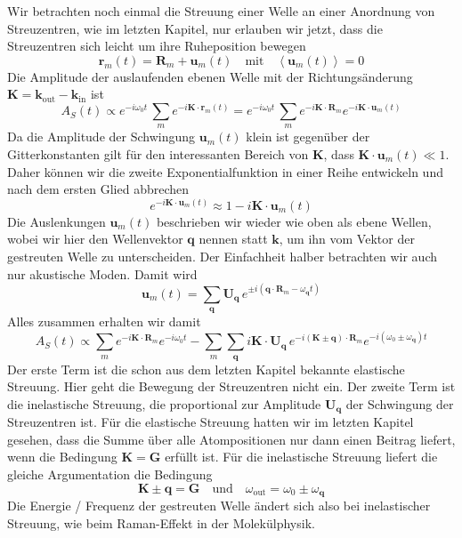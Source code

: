 Wir betrachten noch einmal die Streuung einer Welle an einer Anordnung von Streuzentren, wie im letzten Kapitel, nur erlauben wir jetzt, dass die Streuzentren sich leicht um ihre Ruheposition bewegen
\begin{equation}
\mathbf{r}_m(t) = \mathbf{R}_m + \mathbf{u}_m(t) \quad \text{mit} \quad \left<\mathbf{u}_m(t)\right> = 0
\end{equation}
Die Amplitude der auslaufenden ebenen Welle mit der Richtungsänderung $\mathbf{K} = \mathbf{k}_\text{out} - \mathbf{k}_\text{in}$ ist
\begin{equation}
A_S(t) \propto e^{-i \omega_0 t} \, \sum_m e^{-i \mathbf{K} \cdot \mathbf{r}_m(t)} =
e^{-i \omega_0 t} \, \sum_m e^{-i \mathbf{K} \cdot \mathbf{R}_m}  e^{-i \mathbf{K} \cdot \mathbf{u}_m(t)}
\end{equation}
Da die Amplitude der Schwingung $\mathbf{u}_m(t)$ klein ist gegenüber der Gitterkonstanten  gilt für den interessanten Bereich von $\mathbf{K}$, dass  $\mathbf{K} \cdot\mathbf{u}_m(t) \ll 1 $. Daher können wir die zweite Exponentialfunktion in einer Reihe entwickeln und nach dem ersten Glied abbrechen
\begin{equation}
 e^{-i \mathbf{K} \cdot \mathbf{u}_m(t)} \approx 1 - i \mathbf{K} \cdot \mathbf{u}_m(t)
\end{equation}
Die Auslenkungen $\mathbf{u}_m(t)$ beschrieben wir wieder wie oben als ebene Wellen, wobei wir hier den Wellenvektor $\mathbf{q}$ nennen statt $\mathbf{k}$, um ihn vom Vektor der gestreuten Welle zu unterscheiden. Der Einfachheit halber betrachten wir auch nur akustische Moden. Damit wird
\begin{equation}
\mathbf{u}_m(t) = \sum_\mathbf{q} \mathbf{U}_\mathbf{q} \, 
e^{ \pm i ( \mathbf{q} \cdot \mathbf{R}_m - \omega_\mathbf{q} t ) }
\end{equation}
Alles zusammen erhalten wir damit
\begin{equation}
A_S(t) \propto 
\sum_m e^{-i \mathbf{K} \cdot \mathbf{R}_m}  
e^{-i \omega_0 t} 
-
\sum_m \sum_\mathbf{q}  i \mathbf{K} \cdot \mathbf{U}_\mathbf{q} \,
 e^{-i (\mathbf{K} \pm \mathbf{q} ) \cdot \mathbf{R}_m}  
e^{-i (\omega_0 \pm \omega_\mathbf{q})  t} 
\end{equation}
Der erste Term ist die schon aus dem letzten Kapitel bekannte elastische Streuung. Hier geht die Bewegung der Streuzentren nicht ein. Der zweite Term ist die inelastische Streuung, die proportional zur Amplitude $\mathbf{U}_\mathbf{q}$ der Schwingung der Streuzentren ist. Für die elastische Streuung hatten wir im letzten Kapitel gesehen, dass die Summe über alle Atompositionen nur dann einen Beitrag liefert, wenn die Bedingung $\mathbf{K} = \mathbf{G}$ erfüllt ist. Für die inelastische Streuung liefert die gleiche Argumentation die Bedingung
\begin{equation}
 \mathbf{K} \pm \mathbf{q} = \mathbf{G} \quad \text{und} \quad \omega_\text{out} = \omega_0 \pm \omega_\mathbf{q}
\end{equation}
Die Energie / Frequenz der gestreuten Welle ändert sich also bei inelastischer Streuung, wie beim Raman-Effekt in der Molekülphysik.



